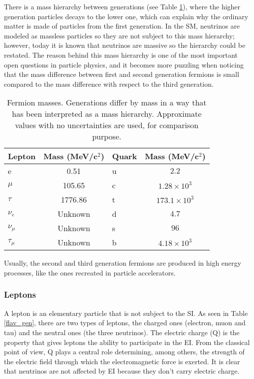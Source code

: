 There is a mass hierarchy between generations (see Table \ref{f_masses}), where the higher generation particles decays to the lower one, which can explain why the ordinary matter is made of particles from the first generation. In the SM, neutrinos are modeled as massless particles so they are not subject to this mass hierarchy; however, today it is known that neutrinos are massive so the hierarchy could be restated. The reason behind this mass hierarchy is one of the most important open questions in particle physics, and it becomes more puzzling when noticing that the mass difference between first and second generation fermions is small compared to the mass difference with respect to the third generation.
\begin{center}
\begin{table}[h]
\centering
\footnotesize
\begin{tabular}{lclc} \hline
Lepton    & Mass (MeV/c$^2$) & Quark  & Mass (MeV/c$^2$)       \\ \hline
e         & 0.51             & u      & $ 2.2$             \\ %
$\mu$     & 105.65           & c      & $ 1.28\times 10^3$ \\ %
$\tau$    & 1776.86          & t      & $ 173.1\times 10^3$\\ %
$\nu_e$   & Unknown          & d      & $ 4.7$             \\ %
$\nu_\mu$ & Unknown          & s      & $ 96$              \\ %
$\tau_\mu$& Unknown          & b      & $ 4.18\times 10^3$ \\ \hline
\end{tabular}
\caption[Fermion masses.]{Fermion masses\cite{pdg}. Generations differ by mass in a way that has been interpreted as a mass hierarchy. Approximate values with no uncertainties are used, for comparison purpose.}\label{f_masses}
\end{table}
\end{center}

Usually, the second and third generation fermions are produced in high energy processes, like the ones recreated in particle accelerators.         

\subsubsection*{Leptons}

A lepton is an elementary particle that is not subject to the SI. As seen in Table \ref{flav_gen}, there are two types of leptons, the charged ones (electron, muon and tau) and the neutral ones (the three neutrinos). The electric charge (Q) is the property that gives leptons the ability to participate in the EI. From the classical point of view, Q plays a central role determining, among others, the strength of the electric field through which the electromagnetic force is exerted. It is clear that neutrinos are not affected by EI because they don't carry electric charge.

